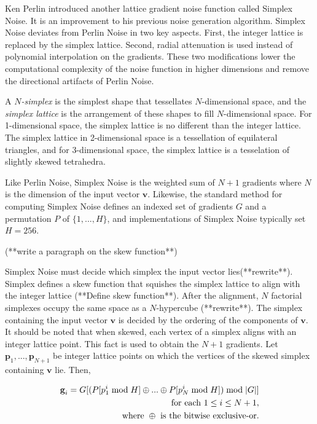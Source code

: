 \documentclass[12pt]{article}
\theoremstyle{definition}
\theoremstyle{remark}
\begin{document}
Ken Perlin\cite{perlin2001,gustavson2005} introduced another lattice gradient noise function called Simplex Noise. It is an improvement to his previous noise generation algorithm. Simplex Noise deviates from Perlin Noise in two key aspects. First, the integer lattice is replaced by the simplex lattice. Second, radial attenuation is used instead of polynomial interpolation on the gradients. These two modifications lower the computational complexity of the noise function in higher dimensions and remove the directional artifacts of Perlin Noise.

A \textit{$N$-simplex} is the simplest shape that tessellates $N$-dimensional space, and the \textit{simplex lattice} is the arrangement of these shapes to fill $N$-dimensional space. For 1-dimensional space, the simplex lattice is no different than the integer lattice. The simplex lattice in 2-dimensional space is a tessellation of equilateral triangles, and for 3-dimensional space, the simplex lattice is a tesselation of slightly skewed tetrahedra.

Like Perlin Noise, Simplex Noise is the weighted sum of $N+1$ gradients where $N$ is the dimension of the input vector $\textbf{v}$. Likewise, the standard method for computing Simplex Noise defines an indexed set of gradients $G$ and a permutation $P$ of $\{1, ..., H\}$, and implementations of Simplex Noise typically set $H=256$.

(**write a paragraph on the skew function**)

Simplex Noise must decide which simplex the input vector lies(**rewrite**). Simplex defines a skew function that squishes the simplex lattice to align with the integer lattice (**Define skew function**). After the alignment, $N$ factorial simplexes occupy the same space as a $N$-hypercube (**rewrite**). The simplex containing the input vector $\textbf{v}$ is decided by the ordering of the components of $\textbf{v}$. It should be noted that when skewed, each vertex of a simplex aligns with an integer lattice point. This fact is used to obtain the $N+1$ gradients. Let $\textbf{p}_1, ..., \textbf{p}_{N+1}$ be integer lattice points on which the vertices of the skewed simplex containing $\textbf{v}$ lie. Then,

\begin{align*}
	\textbf{g}_i=G[(P[p^i_1  \; \textnormal{mod} \; H] \oplus ... \oplus P[p^i_{N}  \; \textnormal{mod} \; H]) \; \textnormal{mod} \; |G|] \\
	\textnormal{for each } 1 \leq i \leq N+1, \\
	\textnormal{where } \oplus \textnormal{ is the bitwise exclusive-or.}
\end{align*}
\end{document}
